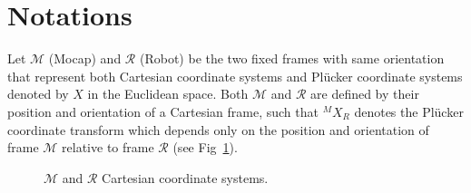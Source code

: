 
\section{Notations}

Let $\mathcal{M}$ (Mocap) and $\mathcal{R}$ (Robot) be the two fixed frames with same orientation that represent both Cartesian coordinate systems and Pl\"ucker coordinate systems denoted by $X$ in the Euclidean space. Both $\mathcal{M}$ and $\mathcal{R}$ are defined by their position and orientation of a Cartesian frame, such that ${}^MX_R$ denotes the Pl\"ucker coordinate transform which depends only on the position and orientation of frame $\mathcal{M}$ relative to frame $\mathcal{R}$ (see Fig~\ref{fig:frames}).

\begin{figure}[ht]
	\caption{$\mathcal{M}$ and $\mathcal{R}$ Cartesian coordinate systems.}
	\label{fig:frames}
\end{figure}


